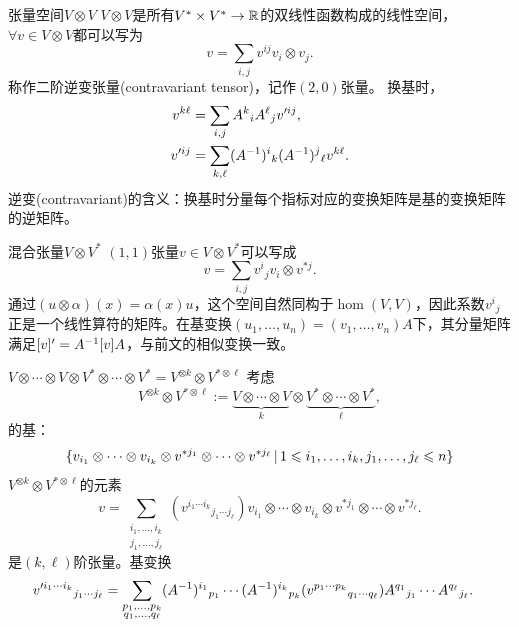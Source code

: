 \begin{example}{张量空间$V \otimes V$}{}
	$V \otimes V$是所有$V^\ast \times V^\ast \to \mathbb{R}$的双线性函数构成的线性空间，%
	$\forall v \in V \otimes V$都可以写为
	\[
		v = \sum_{i,j}v^{ij}v_i \otimes v_j.
	\]
	称作二阶逆变张量(contravariant tensor)，记作$(2,0)$张量。
	\tcblower
	换基时，
	\begin{subequations}\label{eq:la-contravariant-component-change}
		\begin{align}
			v^{k\ell} &= \sum_{i,j}A^k{}_iA^\ell{}_jv'^{ij},\\
			v'^{ij} &= \sum_{k,\ell}(A^{-1})^i{}_k(A^{-1})^j{}_\ell v^{k\ell}.
		\end{align}
	\end{subequations}
	逆变(contravariant)的含义：换基时分量每个指标对应的变换矩阵是基的变换矩阵的逆矩阵。
\end{example}
\begin{example}{混合张量$V \otimes V^\ast$}{}
	$(1,1)$张量$v \in V \otimes V^\ast$可以写成
	\begin{equation}\label{eq:la-mixed-tensor-expansion}
		v = \sum_{i,j}v^i{}_jv_i \otimes v^{\ast j}.
	\end{equation}
    通过$(u \otimes \alpha)(x) = \alpha(x)u$，这个空间自然同构于$\hom(V,V)$，因此系数$v^i{}_j$正是一个线性算符的矩阵。在基变换$(u_1,\ldots,u_n) = (v_1,\ldots,v_n)A$下，其分量矩阵满足$[v]' = A^{-1}[v]A$，与前文的相似变换一致。
\end{example}
\begin{example}{$V \otimes \cdots \otimes V \otimes V^\ast \otimes \cdots \otimes V^\ast = V^{\otimes k} \otimes V^{\ast\otimes\ell}$}{}
	考虑
	\begin{equation}\label{eq:la-mixed-tensor-space}
		V^{\otimes k} \otimes V^{\ast\otimes\ell} := \underbrace{V \otimes \cdots \otimes V}_k \otimes \underbrace{V^\ast \otimes \cdots \otimes V^\ast}_\ell,
	\end{equation}
	的基： 
	\[
		\{v_{i_1} \otimes \cdots \otimes v_{i_k} \otimes v^{\ast j_1} \otimes \cdots \otimes v^{\ast j_\ell}\,\vert\,1 \leqslant i_1,\ldots,i_k,j_1,\ldots,j_\ell \leqslant n\}
	\]
	$V^{\otimes k} \otimes V^{\ast\otimes\ell}$的元素
	\begin{equation}\label{eq:la-tensor-components}
		v = \sum_{\substack{i_1,\ldots,i_k\\j_1,\ldots,j_\ell}}(v^{i_1\cdots i_k}{}_{j_1\cdots j_\ell})v_{i_1} \otimes \cdots \otimes v_{i_k} \otimes v^{\ast j_1} \otimes \cdots \otimes v^{\ast j_\ell}.
	\end{equation}
	是$(k,\ell)$阶张量。基变换
	\begin{align}\label{eq:la-mixed-tensor-component-change}
		&v'^{i_1\cdots i_k}{}_{j_1\cdots j_\ell} = \sum_{\substack{p_1,\ldots,p_k\\q_1,\ldots,q_\ell}}(A^{-1})^{i_1}{}_{p_1}\cdots(A^{-1})^{i_k}{}_{p_k}(v^{p_1\cdots p_k}{}_{q_1\cdots q_\ell})A^{q_1}{}_{j_1}\cdots A^{q_\ell}{}_{j_\ell}.
	\end{align}
\end{example}
